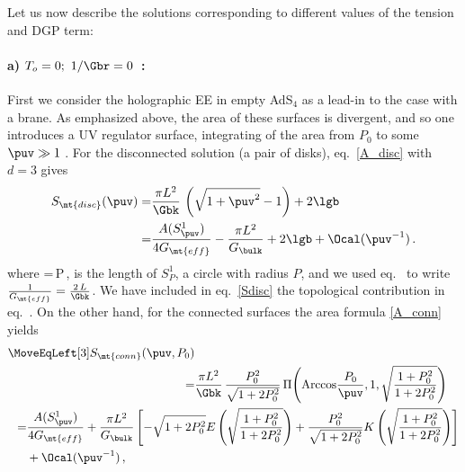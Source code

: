 \begin{figure}[h]
	\def\svgwidth{0.5\linewidth}
\end{figure}

Let us now describe the solutions corresponding to different values of the tension and DGP term:
\paragraph{a) $T_o=0;\ 1/\Gbr=0$\ :} First we consider the holographic EE in empty AdS$_4$ as a lead-in to the case with a brane. As emphasized above, the area of these surfaces is divergent, and so one introduces a UV regulator surface,  integrating of the area from $P_0$ to some $\puv\gg1$ \cite{Krtous:2014pva}. For the disconnected solution (\ie a pair of disks), eq.~\eqref{A_disc} with $d=3$ gives
\begin{align}\label{Sdisc}
S_\mt{disc}(\puv)
=& \frac{\pi L^2}{\Gbk}\,\left( \sqrt{1+\puv^2}-1 \right)+2 \lgb
\\
=& \frac{A(S^1_{\puv})}{4G_\mt{eff}}
- \frac{\pi L^2}{G_\bulk} + 2\lgb
+ \Ocal(\puv^{-1})\,.
\label{eq:lonely}
\end{align}
where
\beq\label{sample}
=\,P\,,
\eeq
is the length of $S^1_P$, a circle with radius $P$, and we used eq.~ to write $\frac{1}{G_\mt{eff}}=\frac{2\,L}{\Gbk}$.
We have included in eq.~\eqref{Sdisc} the topological contribution in eq.~. On the other hand, for the connected surfaces the area formula \eqref{A_conn} yields
\begin{align}\label{eq:dietCoke}
\begin{split}
\MoveEqLeft[3]
S_\mt{conn}(\puv,P_0)
\\
=& \frac{\pi L^2}{\Gbk}\,\frac{P_0^2}{\sqrt{1+2P_0^2}}\, \Pi\!\left( \mbox{Arccos}\frac{P_0}{\puv},1,\sqrt{\frac{1+P_0^2}{1+2P_0^2}} \right)
\end{split}
\\
\begin{split}
=& \frac{A(S^1_{\puv})}{4G_\mt{eff}}
+ \frac{\pi L^2}{G_\bulk}\left[
-\sqrt{1+2P_0^2} E\left(\sqrt{\frac{1+P_0^2}{1+2P_0^2}}\right)
+ \frac{P_0^2}{\sqrt{1+2P_0^2}} K\left(\sqrt{\frac{1+P_0^2}{1+2P_0^2}}\right)
\right]
\\
&+ \Ocal(\puv^{-1})\,,
\end{split}
\label{eq:friendless}
\end{align}
